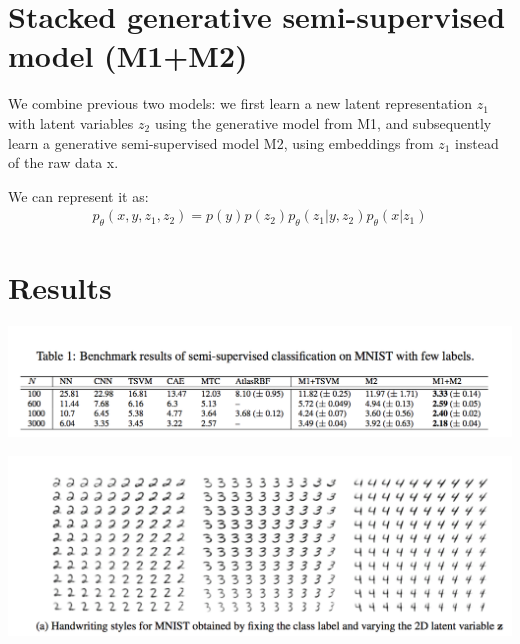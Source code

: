 \documentclass{beamer}
\let\tempone\itemize
\let\temptwo\enditemize
\renewenvironment{itemize}{\tempone\addtolength{\itemsep}{0.5\baselineskip}}{\temptwo}
\begin{document}
\section{Stacked generative semi-supervised model (M1+M2)}

\begin{frame}
  \begin{center}
     \begin{itemize}
        \item We combine previous two models: we first learn a new latent representation $z_1$ with latent variables $z_2$ using the generative model from M1, and subsequently learn a generative semi-supervised model M2, using embeddings from $z_1$ instead of the raw data x.
        \item We can represent it as: 
          \begin{align*}
            p_{\theta}(x,y,z_1,z_2) = p(y)p(z_2)p_{\theta}(z_1|y,z_2) p_{\theta}(x|z_1)
          \end{align*}
      \end{itemize}
  \end{center}
\end{frame}


\section{Results}
\begin{frame}
  \begin{center}

\includegraphics[scale=0.4]{p1.png}
  \end{center}
\end{frame}

\begin{frame}
  \begin{center}

\includegraphics[scale=0.4]{p2.png}

  \end{center}
\end{frame}
\end{document}
